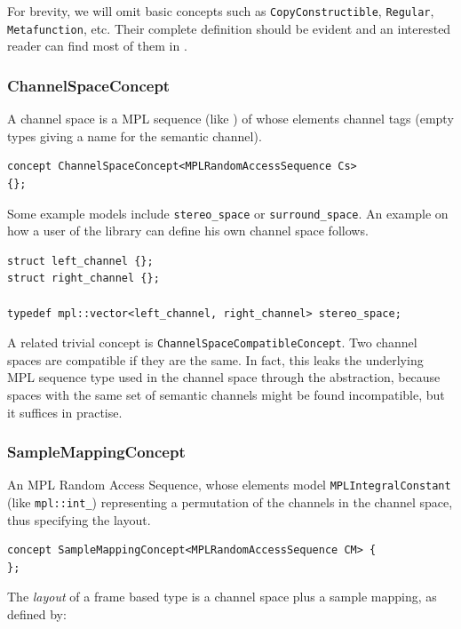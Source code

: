 For brevity, we will omit basic concepts such as
\texttt{Copy\-Constructible}, \texttt{Regular}, \texttt{Metafunction},
etc. Their complete definition should be evident and an interested
reader can find most of them in \cite{stepanov09elements}.

\subsubsection{{ChannelSpaceConcept}}

A channel space is a MPL sequence (like
) of whose elements channel tags (empty types giving a
name for the semantic channel).

\begin{lstlisting}
concept ChannelSpaceConcept<MPLRandomAccessSequence Cs> 
{};
\end{lstlisting}

Some example models include \texttt{stereo\-\_space} or
\texttt{surround\-\_space}. An example on how a user of the library
can define his own channel space follows.

\begin{lstlisting}
struct left_channel {};
struct right_channel {};

typedef mpl::vector<left_channel, right_channel> stereo_space;
\end{lstlisting}

A related trivial concept is
\texttt{Channel\-Space\-Compatible\-Con\-cept}. Two channel spaces are
compatible if they are the same. In fact, this leaks the underlying
MPL sequence type used in the channel space through the abstraction,
because spaces with the same set of semantic channels might be found
incompatible, but it suffices in practise.

\subsubsection{{SampleMappingConcept}}

An MPL Random Access Sequence, whose elements model
\texttt{MPL\-Integral\-Constant} (like \texttt{mpl::int\_})
representing a permutation of the channels in the channel space, thus
specifying the layout.

\begin{lstlisting}
concept SampleMappingConcept<MPLRandomAccessSequence CM> {
};
\end{lstlisting}

The \emph{layout} of a frame based type is a channel
space plus a sample mapping, as defined by:

